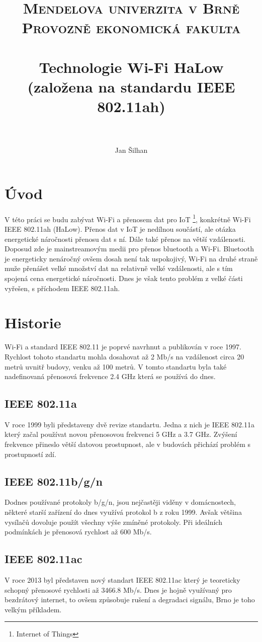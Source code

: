 \documentclass[paper=a4, fontsize=11pt]{scrartcl}
\date{\displaydate{date}}
\title{	
\normalfont \normalsize 
\textsc{Mendelova univerzita v Brně\\Provozně ekonomická fakulta} \\ [25pt] 
\horrule{0.5pt} \\[0.4cm] 
\huge Technologie Wi-Fi HaLow (založena na standardu IEEE 802.11ah) \\ %
\horrule{2pt} \\[0.5cm] 
}
\author{Jan Šilhan} %
\date{\displaydate{date}}
\numberwithin{equation}{section}
\numberwithin{figure}{section}
\numberwithin{table}{section}
\begin{document}
\maketitle 

\newpage

\tableofcontents

\newpage


\section{Úvod}

V této práci se budu zabývat Wi-Fi a přenosem dat pro IoT \footnote{Internet of Things}, 
konkrétně Wi-Fi IEEE 802.11ah (HaLow).
Přenos dat v IoT je nedílnou součástí, ale otázka energetické náročnosti přenosu dat s ní.
Dále také přenos na větší vzdálenosti. 
Doposud zde je mainstreamovým medii pro přenos bluetooth a Wi-Fi. 
Bluetooth je energeticky nenáročný ovšem dosah není tak uspokojivý, 
Wi-Fi na druhé straně muže přenášet velké množství dat na relativně velké vzdálenosti, 
ale s tím spojená cena energetické náročnosti. 
Dnes je však tento problém z velké části vyřešen, s příchodem IEEE 802.11ah. 

\section{Historie}
Wi-Fi a standard IEEE 802.11 je poprvé navrhnut a publikován v roce 1997. 
Rychlost tohoto standartu mohla dosahovat až 2 Mb/s na vzdálenost circa 20 metrů uvnitř budovy, 
venku až 100 metrů.
V tomto standartu byla také nadefinovaná přenosová frekvence 2.4 GHz která se používá do dnes.
	\subsection{IEEE 802.11a}
	V roce 1999 byli představeny dvě revize standartu. Jedna z nich je 
	IEEE 802.11a který začal používat novou přenosovou frekvenci 5 GHz a 3.7 GHz. 
	Zvýšení frekvence přineslo větší datovou prostupnost, 
	ale v budovách přichází problém s prostupností zdí. 

	\subsection{IEEE 802.11b/g/n}
	Dodnes používané protokoly b/g/n, 
	jsou nejčastěji viděny v domácnostech, 
	některé starší zařízení do dnes využívá protokol b z roku 1999. 
	Avšak většina vysílačů dovoluje použít všechny výše zmíněné protokoly. 
	Při ideálních podmínkách je přenosová rychlost až 600 Mb/s.

	\subsection{IEEE 802.11ac}
	V roce 2013 byl představen nový standart IEEE 802.11ac
	 který je teoreticky schopný přenosové rychlosti až 3466.8 Mb/s. 
	 Dnes je hojně využívaný pro bezdrátový internet, to ovšem způsobuje rušení a degradaci signálu,
	 Brno je toho velkým příkladem.
\end{document}
